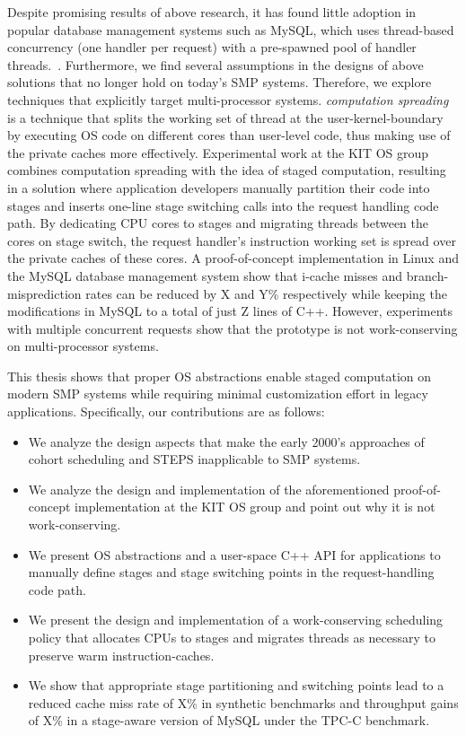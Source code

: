 \documentclass[12pt,a4paper]{book}
\begin{document}
Despite promising results of above research, it has found little adoption in popular database management systems such as MySQL, which uses thread-based concurrency (one handler per request) with a pre-spawned pool of handler threads.~\cite{mysqlThreading}.
Furthermore, we find several assumptions in the designs of above solutions that no longer hold on today's SMP systems.
Therefore, we explore techniques that explicitly target multi-processor systems.
\emph{computation spreading} is a technique that splits the working set of thread at the user-kernel-boundary by executing OS code on different cores than user-level code, thus making use of the private caches more effectively.
Experimental work at the KIT OS group combines computation spreading with the idea of staged computation, resulting in a solution where
application developers manually partition their code into stages and inserts one-line stage switching calls into the request handling code path.
By dedicating CPU cores to stages and migrating threads between the cores on stage switch, the request handler's instruction working set is spread over the private caches of these cores.
A proof-of-concept implementation in Linux and the MySQL database management system show that i-cache misses and branch-misprediction rates can be reduced by X and Y\% respectively while keeping the modifications in MySQL to a total of just Z lines of C++.
However, experiments with multiple concurrent requests show that the prototype is not work-conserving on multi-processor systems.

This thesis shows that proper OS abstractions enable staged computation on modern SMP systems while requiring minimal customization effort in legacy applications.
Specifically, our contributions are as follows:
\begin{itemize}
    \item We analyze the design aspects that make the early 2000's approaches of cohort scheduling and STEPS inapplicable to SMP systems.
    \item We analyze the design and implementation of the aforementioned proof-of-concept implementation at the KIT OS group and point out why it is not work-conserving.
    \item We present OS abstractions and a user-space C++ API for applications to manually define stages and stage switching points in the request-handling code path.
    \item We present the design and implementation of a work-conserving scheduling policy that allocates CPUs to stages and migrates threads as necessary to preserve warm instruction-caches.
    \item We show that appropriate stage partitioning and switching points lead to a reduced cache miss rate of X\% in synthetic benchmarks and throughput gains of X\% in a stage-aware version of MySQL under the TPC-C benchmark.
\end{itemize}
\end{document}
